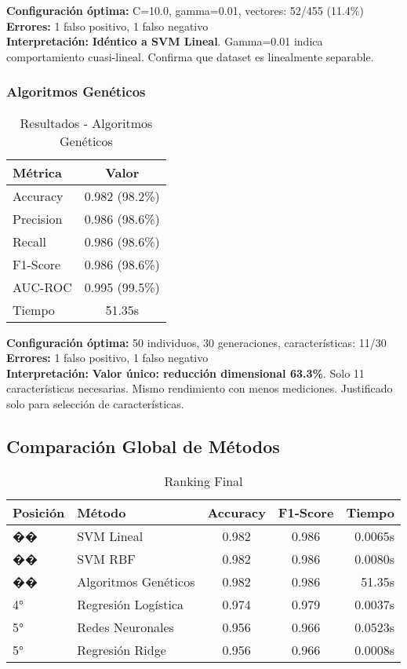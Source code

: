 \documentclass[12pt,a4paper]{article}
\begin{document}
\textbf{Configuración óptima:} C=10.0, gamma=0.01, vectores: 52/455 (11.4\%)\\
\textbf{Errores:} 1 falso positivo, 1 falso negativo\\
\textbf{Interpretación:} \textbf{Idéntico a SVM Lineal}. Gamma=0.01 indica comportamiento cuasi-lineal. Confirma que dataset es linealmente separable.

\subsubsection{Algoritmos Genéticos}

\begin{table}[H]
\centering
\caption{Resultados - Algoritmos Genéticos}
\begin{tabular}{lc}
\toprule
\textbf{Métrica} & \textbf{Valor} \\
\midrule
Accuracy & 0.982 (98.2\%) \\
Precision & 0.986 (98.6\%) \\
Recall & 0.986 (98.6\%) \\
F1-Score & 0.986 (98.6\%) \\
AUC-ROC & 0.995 (99.5\%) \\
Tiempo & 51.35s \\
\bottomrule
\end{tabular}
\end{table}

\textbf{Configuración óptima:} 50 individuos, 30 generaciones, características: 11/30\\
\textbf{Errores:} 1 falso positivo, 1 falso negativo\\
\textbf{Interpretación:} \textbf{Valor único: reducción dimensional 63.3\%}. Solo 11 características necesarias. Mismo rendimiento con menos mediciones. Justificado solo para selección de características.


\subsection{Comparación Global de Métodos}

\begin{table}[H]
\centering
\caption{Ranking Final}
\begin{tabular}{llccr}
\toprule
\textbf{Posición} & \textbf{Método} & \textbf{Accuracy} & \textbf{F1-Score} & \textbf{Tiempo} \\
\midrule
�� & SVM Lineal & 0.982 & 0.986 & 0.0065s \\
�� & SVM RBF & 0.982 & 0.986 & 0.0080s \\
�� & Algoritmos Genéticos & 0.982 & 0.986 & 51.35s \\
4° & Regresión Logística & 0.974 & 0.979 & 0.0037s \\
5° & Redes Neuronales & 0.956 & 0.966 & 0.0523s \\
5° & Regresión Ridge & 0.956 & 0.966 & 0.0008s \\
\bottomrule
\end{tabular}
\end{table}
\end{document}

